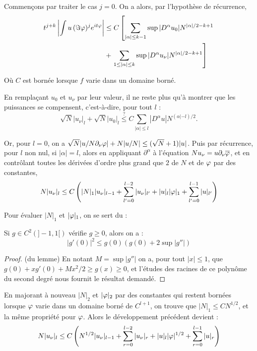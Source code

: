Commençons par traiter le cas $j=0$. On a alors, par l'hypothèse de récurrence,
\begin{align*}
  t^{j+k}\left|\int u\,(\Im \varphi)^je^{it\varphi} \right| &\leq
  C\left[\sum_{|\alpha| \leq k-1}\sup |D^{\alpha}u_0|N^{|\alpha|/2-k+1}\right. \\&+
    \left.\sum_{1 \leq |\alpha| \leq k}\sup
    |D^{\alpha}u_{\nu}|N^{|\alpha|/2-k+1}\right] 
\end{align*}

\noindent Où $C$ est bornée lorsque $f$ varie dans un domaine borné.

En remplaçant $u_0$ et $u_{\nu}$ par leur valeur, il ne reste plus qu'à montrer que les puissances se compensent, c'est-à-dire, pour tout $l$ :
\begin{equation*}
  \sqrt{N}|u_{\nu}|_l + \sqrt{N}|u_0|_l \stackrel{?}{\leq} C \sum_{|\alpha| \leq l}|D^{\alpha}u|N^{(\alpha|-l)/2}.
\end{equation*}

Or, pour $l=0$, on a  $\sqrt{N} |u/N \partial_{\nu}\varphi| + N |u/N| \leq (\sqrt{N}+1)|u|$. Puis par récurrence, pour $l$ non nul, si $|\alpha|=l$, alors en appliquant $\partial^{\alpha}$ à l'équation $Nu_{\nu}=u \partial_{\nu}\overline{\varphi}$, et en contrôlant toutes les dérivées d'ordre plus grand que $2$ de $N$ et de $\varphi$ par des constantes,
\begin{equation*}
  N|u_{\nu}|_l \leq C\left(|N|_1|u_{\nu}|_{l-1} + \sum_{l'=0}^{l-2}|u_{\nu}|_{l'} + |u|_l|\varphi|_1 + \sum_{l'=0}^{l-1}|u|_{l'}\right)
\end{equation*}

Pour évaluer $|N|_1$ et $|\varphi|_1$, on se sert du :
\begin{lem}
  \label{horm7.7.2}
  Si $g \in C^2(]-1,1[)$ vérifie $g \geq 0$, alors on a :
  \begin{equation*}
    |g'(0)|^2 \leq g(0)\left(g(0) + 2 \sup |g''|\right)
  \end{equation*}
\end{lem}
\begin{proof} (du lemme) En notant $M= \sup |g''|$ on a, pour tout $|x| \leq 1$, que $g(0)+xg'(0)+Mx^2/2 \geq g(x) \geq 0$, et l'études des racines de ce polynôme du second degré nous fournit le résultat demandé.\end{proof}

En majorant à nouveau $|N|_2$ et $|\varphi|_2$ par des constantes qui restent bornées lorsque $\varphi$ varie dans un domaine borné de $C^{l+1}$, on trouve que $|N|_1 \leq C N^{1/2}$, et la même propriété pour $\varphi$. Alors le développement précédent devient :
\begin{equation*}
  N|u_{\nu}|_l \leq C\left(N^{1/2}|u_{\nu}|_{l-1} + \sum_{r=0}^{l-2}|u_{\nu}|_{r} + |u|_l|\varphi|^{1/2} + \sum_{r=0}^{l-1}|u|_{r}\right)
\end{equation*}

